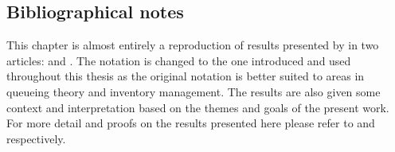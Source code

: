 \subsection{Bibliographical notes}

This chapter is almost entirely a reproduction of results presented by
\citeauthor{farias2003LP2ADP} in two articles:  and
. The notation is changed to the one introduced
and used throughout this thesis as the original notation is better suited to
areas in queueing theory and inventory management. The results are also given
some context and interpretation based on the themes and goals of the present
work. For more detail and proofs on the results presented here please refer to
\cite{farias2003LP2ADP} and \cite{farias2004constraint} respectively.